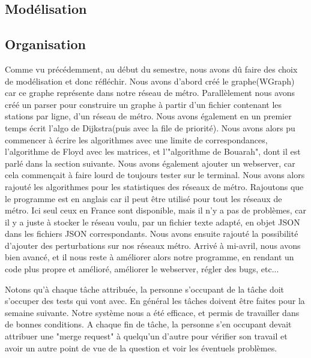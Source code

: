 \documentclass[french, 12pt]{article}
\begin{document}
\subsection{Modélisation}

\subsection{Organisation}
Comme vu précédemment, au début du semestre, nous avons dû faire des choix de modélisation et donc réfléchir. Nous avons d'abord créé le graphe(W\-Graph) car ce graphe représente dans notre réseau de métro.
Parallèlement nous avons créé un parser pour construire un graphe à partir d'un fichier contenant les stations par ligne, d'un réseau de métro.
Nous avons également en un premier temps écrit l'algo de Dijkstra(puis avec la file de priorité).
Nous avons alors pu commencer à écrire les algorithmes avec une limite de correspondances, l'algorithme de Floyd avec les matrices, et l'"algorithme de Bouarah", dont il est parlé dans la section suivante.
Nous avons également ajouter un webserver, car cela commençait à faire lourd de toujours tester sur le terminal.
Nous avons alors rajouté les algorithmes pour les statistiques des réseaux de métro.
Rajoutons que le programme est en anglais car il peut être utilisé pour tout les réseaux de métro. Ici seul ceux en France sont disponible, mais il n'y a pas de problèmes, car il y a juste à stocker le réseau voulu, par un fichier texte adapté, en objet JSON dans les fichiers JSON correspondants.
Nous avons ensuite rajouté la possibilité d'ajouter des perturbations sur nos réseaux métro.
Arrivé à mi-avril, nous avons bien avancé, et il nous reste à améliorer alors notre programme, en rendant un code plus propre et amélioré, améliorer le webserver, régler des bugs, etc...

Notons qu'à chaque tâche attribuée, la personne s'occupant de la tâche doit s'occuper des tests qui vont avec. En général les tâches doivent être faites pour la semaine suivante.
Notre système nous a été efficace, et permis de travailler dans de bonnes conditions.
A chaque fin de tâche, la personne s'en occupant devait attribuer une "merge request" à quelqu'un d'autre pour vérifier son travail et avoir un autre point de vue de la question et voir les éventuels problèmes.
\end{document}
